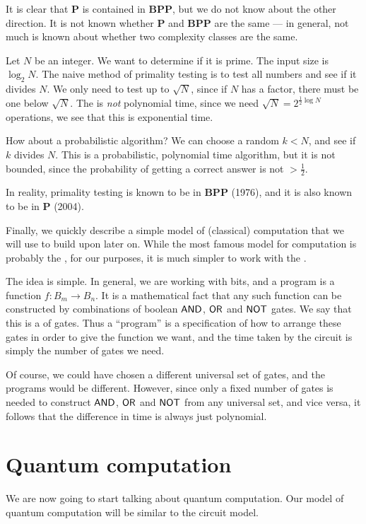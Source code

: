 It is clear that \textbf{P} is contained in \textbf{BPP}, but we do not know about the other direction. It is not known whether \textbf{P} and \textbf{BPP} are the same --- in general, not much is known about whether two complexity classes are the same.

\begin{eg}
  Let $N$ be an integer. We want to determine if it is prime. The input size is $\log_2 N$. The naive method of primality testing is to test all numbers and see if it divides $N$. We only need to test up to $\sqrt{N}$, since if $N$ has a factor, there must be one below $\sqrt{N}$. The is \emph{not} polynomial time, since we need $\sqrt{N} = 2^{\frac{1}{2} \log N}$ operations, we see that this is exponential time.

  How about a probabilistic algorithm? We can choose a random $k < N$, and see if $k$ divides $N$. This is a probabilistic, polynomial time algorithm, but it is not bounded, since the probability of getting a correct answer is not $> \frac{1}{2}$.

  In reality, primality testing is known to be in \textbf{BPP} (1976), and it is also known to be in \textbf{P} (2004).
\end{eg}

Finally, we quickly describe a simple model of (classical) computation that we will use to build upon later on. While the most famous model for computation is probably the , for our purposes, it is much simpler to work with the .

The idea is simple. In general, we are working with bits, and a program is a function $f: B_m \to B_n$. It is a mathematical fact that any such function can be constructed by combinations of boolean $\mathsf{AND}$, $\mathsf{OR}$ and $\mathsf{NOT}$ gates. We say that this is a  of gates. Thus a ``program'' is a specification of how to arrange these gates in order to give the function we want, and the time taken by the circuit is simply the number of gates we need.

Of course, we could have chosen a different universal set of gates, and the programs would be different. However, since only a fixed number of gates is needed to construct $\mathsf{AND}$, $\mathsf{OR}$ and $\mathsf{NOT}$ from any universal set, and vice versa, it follows that the difference in time is always just polynomial.

\section{Quantum computation}
We are now going to start talking about quantum computation. Our model of quantum computation will be similar to the circuit model.

